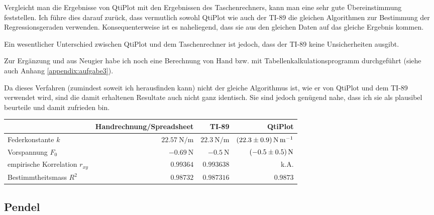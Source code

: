 Vergleicht  man   die  Ergebnisse   von  QtiPlot   mit  den   Ergebnissen  des
Taschenrechners, kann  man eine  sehr gute  \"Ubereinstimmung feststellen. Ich
f\"uhre  dies  darauf  zur\"uck,  dass  vermutlich  sowohl  QtiPlot  wie  auch
der  TI-89  die gleichen  Algorithmen  zur  Bestimmung der  Regressionsgeraden
verwenden. Konsequenterweise  ist es  naheliegend, dass  sie aus  den gleichen
Daten auf das gleiche Ergebnis kommen.

Ein  wesentlicher  Unterschied zwischen  QtiPlot  und  dem Taschenrechner  ist
jedoch, dass der TI-89 keine Unsicherheiten ausgibt.

Zur  Erg\"anzung und  aus  Neugier  habe ich  noch  eine  Berechnung von  Hand
bzw.  mit  Tabellenkalkulationsprogramm   durchgef\"uhrt  (siehe  auch  Anhang
\ref{appendix:aufgabe3}).

Da dieses Verfahren (zumindest soweit ich herausfinden kann) nicht der gleiche
Algorithmus  ist, wie  er  von  QtiPlot und  dem  TI-89  verwendet wird,  sind
die  damit erhaltenen  Resultate auch  nicht ganz  identisch. Sie sind  jedoch
gen\"ugend nahe, dass ich sie als plausibel beurteile und damit zufrieden bin.

\begin{center}
\begin{tabular}{lrrr}
    \toprule
                                    & Handrechnung/Spreadsheet             & TI-89 & QtiPlot                                \\
    \midrule
    Federkonstante $k$              & $\SI{22.57}{\newton\per\meter}$ & $\SI{22.3}{\newton\per\meter}$ & $\SI{22.3 \pm 0.9}{\newton\per\meter}$ \\
    Vorspannung $F_0$               & $\SI{-0.69}{\newton}$           & $\SI{-0.5}{\newton}$           & $\SI{-0.5 \pm 0.5}{\newton}$           \\
    empirische Korrelation $r_{xy}$ & $0.99364$                       & $0.993638$                     & k.A.                                   \\
    Bestimmtheitsmass $R^2$         & $0.98732$                       & $0.987316$                     & $0.9873$                               \\
    \bottomrule
\end{tabular}
\end{center}


\clearpage
\subsection{Pendel}

